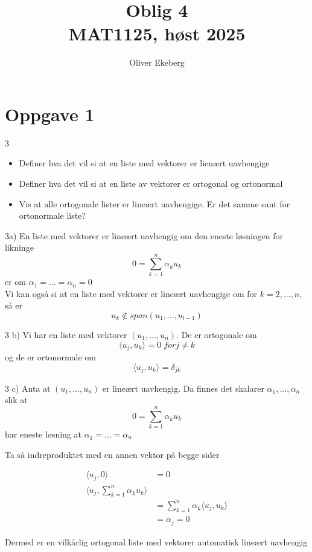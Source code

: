 \documentclass[a4paper,norsk]{article}
\title{Oblig 4 \\ MAT1125, høst 2025}
\author{Oliver Ekeberg}
\begin{document}
\maketitle

\tableofcontents

\section*{Oppgave 1}

\begin{oppgavebox}{3}{}
\begin{itemize}
    \item Definer hva det vil si at en liste med vektorer er lienært uavhengige
    \item Definer hva det vil si at en liste av vektorer er ortogonal og ortonormal
    \item Vis at alle ortogonale lister er lineært uavhengige. Er det samme sant for ortonormale liste?
\end{itemize}

\begin{proofbox}{3a)}{}
En liste med vektorer er lineært uavhengig om den eneste løsningen for likninge
\[
    0 = \sum_{ k=1 }^{ n } \alpha_{k}^{} u_k
\]
er om $ \alpha_{1}^{} = ... = \alpha_{n}^{} =0$ \\

Vi kan også si at en liste med vektorer er lineært uavhengige om for $ k=2, ..., n $, så er 
\[
    u_k \notin span \left( u_1, ..., u_{l-1} \right) 
\]
 

\end{proofbox}


\begin{proofbox}{3 b)}{}
Vi har en liste med vektorer $ \left( u_1, ..., u_n \right)  $. De er ortogonale om 
\[
    \langle u_j, u_k \rangle_{  } = 0 \; for j\neq k
\]
og de er ortonormale om 
\[
    \langle u_j, u_k \rangle_{  } = \delta_{jk}
\]
\end{proofbox}


\begin{proofbox}{3 c)}{}
Anta at $ \left( u_1, ..., u_n \right)  $ er lineært uavhengig. Da finnes det skalarer $ \alpha_{1}^{} , ..., \alpha_{n}^{}  $  slik at 
\[
    0 = \sum_{ k=1 }^{ n } \alpha_{k}^{} u_k
\]
har eneste løsning at $ \alpha_{1}^{} = ... = \alpha_{n}^{}  $ 

Ta så indreproduktet med en annen vektor på begge sider

\begin{align*}
    \langle u_j, 0 \rangle_{  } &= 0\\
    \langle u_j, \sum_{ k=1 }^{ n } \alpha_{k}^{} u_k \rangle_{  } \\
    &= \sum_{ k=1 }^{ n } \alpha_{k}^{} \langle u_j, u_k \rangle_{  } \\
    &= \alpha_{j}^{} =0
\end{align*}

Dermed er en vilkårlig ortogonal liste med vektorer automatisk lineært uavhengig
\end{proofbox}
\end{oppgavebox}
\end{document}

